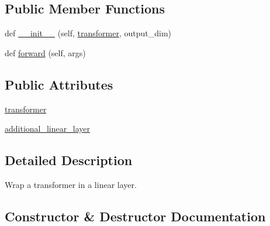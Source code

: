 \subsection*{Public Member Functions}
\begin{DoxyCompactItemize}
\item 
def \hyperlink{classparlai_1_1agents_1_1transformer_1_1modules_1_1TransformerLinearWrapper_a2676a49582292330a7829e235a7cf8f5}{\+\_\+\+\_\+init\+\_\+\+\_\+} (self, \hyperlink{classparlai_1_1agents_1_1transformer_1_1modules_1_1TransformerLinearWrapper_acac2d2f099f07b21f792326f90541ffd}{transformer}, output\+\_\+dim)
\item 
def \hyperlink{classparlai_1_1agents_1_1transformer_1_1modules_1_1TransformerLinearWrapper_a82f571e85719bde36f8fcf09f27d3e4c}{forward} (self, args)
\end{DoxyCompactItemize}
\subsection*{Public Attributes}
\begin{DoxyCompactItemize}
\item 
\hyperlink{classparlai_1_1agents_1_1transformer_1_1modules_1_1TransformerLinearWrapper_acac2d2f099f07b21f792326f90541ffd}{transformer}
\item 
\hyperlink{classparlai_1_1agents_1_1transformer_1_1modules_1_1TransformerLinearWrapper_af083195926e1f091010ecb4c6d409a2a}{additional\+\_\+linear\+\_\+layer}
\end{DoxyCompactItemize}


\subsection{Detailed Description}
\begin{DoxyVerb}Wrap a transformer in a linear layer.
\end{DoxyVerb}
 

\subsection{Constructor \& Destructor Documentation}
\mbox{\label{classparlai_1_1agents_1_1transformer_1_1modules_1_1TransformerLinearWrapper_a2676a49582292330a7829e235a7cf8f5}} 
